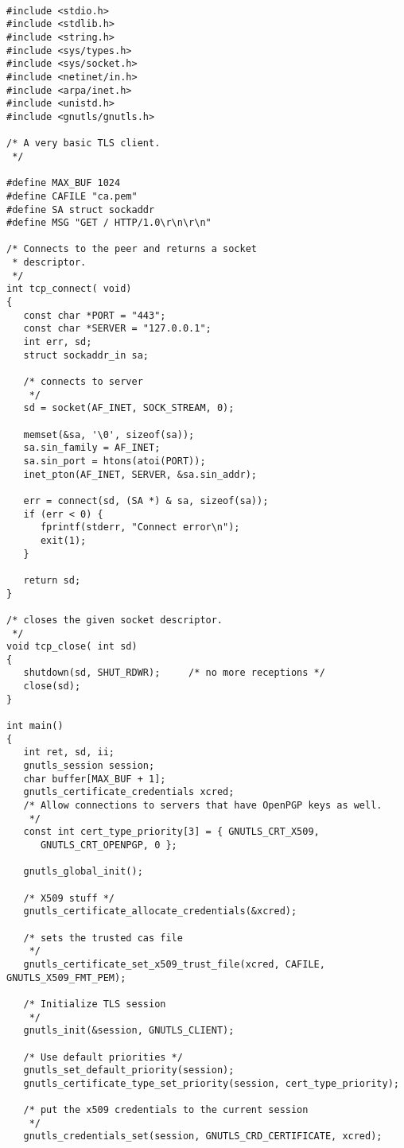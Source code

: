 \begin{verbatim}

#include <stdio.h>
#include <stdlib.h>
#include <string.h>
#include <sys/types.h>
#include <sys/socket.h>
#include <netinet/in.h>
#include <arpa/inet.h>
#include <unistd.h>
#include <gnutls/gnutls.h>

/* A very basic TLS client.
 */

#define MAX_BUF 1024
#define CAFILE "ca.pem"
#define SA struct sockaddr
#define MSG "GET / HTTP/1.0\r\n\r\n"

/* Connects to the peer and returns a socket
 * descriptor.
 */
int tcp_connect( void)
{
   const char *PORT = "443";
   const char *SERVER = "127.0.0.1";
   int err, sd;
   struct sockaddr_in sa;

   /* connects to server 
    */
   sd = socket(AF_INET, SOCK_STREAM, 0);

   memset(&sa, '\0', sizeof(sa));
   sa.sin_family = AF_INET;
   sa.sin_port = htons(atoi(PORT));
   inet_pton(AF_INET, SERVER, &sa.sin_addr);

   err = connect(sd, (SA *) & sa, sizeof(sa));
   if (err < 0) {
      fprintf(stderr, "Connect error\n");
      exit(1);
   }

   return sd;
}

/* closes the given socket descriptor.
 */
void tcp_close( int sd) 
{
   shutdown(sd, SHUT_RDWR);     /* no more receptions */
   close(sd);
}

int main()
{
   int ret, sd, ii;
   gnutls_session session;
   char buffer[MAX_BUF + 1];
   gnutls_certificate_credentials xcred;
   /* Allow connections to servers that have OpenPGP keys as well.
    */
   const int cert_type_priority[3] = { GNUTLS_CRT_X509, 
      GNUTLS_CRT_OPENPGP, 0 };

   gnutls_global_init();

   /* X509 stuff */
   gnutls_certificate_allocate_credentials(&xcred);

   /* sets the trusted cas file
    */
   gnutls_certificate_set_x509_trust_file(xcred, CAFILE, GNUTLS_X509_FMT_PEM);

   /* Initialize TLS session 
    */
   gnutls_init(&session, GNUTLS_CLIENT);

   /* Use default priorities */
   gnutls_set_default_priority(session);
   gnutls_certificate_type_set_priority(session, cert_type_priority);

   /* put the x509 credentials to the current session
    */
   gnutls_credentials_set(session, GNUTLS_CRD_CERTIFICATE, xcred);


\end{verbatim}
